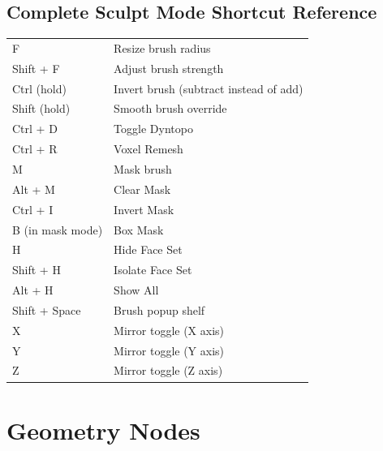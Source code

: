 \subsection{Complete Sculpt Mode Shortcut Reference}
\label{sec:sculptshortcuts}

\begin{shortcutbox}
\begin{center}
\begin{tabularx}{\textwidth}{L{4cm}X}
\toprule
{}
 &  \\
\midrule
F & Resize brush radius \\
Shift + F & Adjust brush strength \\
Ctrl (hold) & Invert brush (subtract instead of add) \\
Shift (hold) & Smooth brush override \\
Ctrl + D & Toggle Dyntopo \\
Ctrl + R & Voxel Remesh \\
M & Mask brush \\
Alt + M & Clear Mask \\
Ctrl + I & Invert Mask \\
B (in mask mode) & Box Mask \\
H & Hide Face Set \\
Shift + H & Isolate Face Set \\
Alt + H & Show All \\
Shift + Space & Brush popup shelf \\
X & Mirror toggle (X axis) \\
Y & Mirror toggle (Y axis) \\
Z & Mirror toggle (Z axis) \\
\bottomrule
\end{tabularx}
\end{center}
\end{shortcutbox}



\section{Geometry Nodes}
\label{sec:geonodes}

